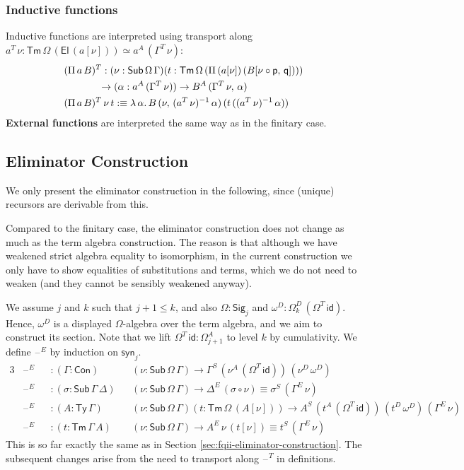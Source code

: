 \documentclass[12pt,a4paper,twoside,openany]{book}
\theoremstyle{remark}
\theoremstyle{definition}
\theoremstyle{theorem}
\newcommand{\id}{\mathsf{id}}
\newcommand{\Con}{\mathsf{Con}}
\newcommand{\Sub}{\mathsf{Sub}}
\newcommand{\Tm}{\mathsf{Tm}}
\newcommand{\Ty}{\mathsf{Ty}}
\newcommand{\El}{\mathsf{El}}
\newcommand{\blank}{\mathord{\hspace{1pt}\text{--}\hspace{1pt}}}
\newcommand{\Pii}{\Pi}
\newcommand{\Sig}{\mathsf{Sig}}
\newcommand{\p}{\mathsf{p}}
\newcommand{\q}{\mathsf{q}}
\newcommand{\syn}{\mathsf{syn}}
\newcommand{\defn}{:\equiv}
\begin{document}
\subsubsection{Inductive functions}
Inductive functions are interpreted using transport along $a^T\,\nu :
\Tm\,\Omega\,(\El\,(a[\nu])) \simeq a^A\,(\Gamma^T\,\nu)$:
\begin{alignat*}{3}
  &(\Pii\,a\,B)^T : (\nu : \Sub\,\Omega\,\Gamma)(t : \Tm\,\Omega\,(\Pii\,(a[\nu])\,(B[\nu\circ\p,\,\q])))\\
  & \hspace{3.5em}\to (\alpha : a^A\,(\Gamma^T\,\nu)) \to B^A\,(\Gamma^T\,\nu,\,\alpha)\\
  &(\Pii\,a\,B)^T\,\nu\,t \defn \lambda\,\alpha.\,
         B\,(\nu,\,(a^T\,\nu)^{-1}\,\alpha)\,(t\,((a^T\,\nu)^{-1}\,\alpha))
\end{alignat*}
\textbf{External functions} are interpreted the same way as in the finitary case.

\subsection{Eliminator Construction}

We only present the eliminator construction in the following, since (unique)
recursors are derivable from this.

Compared to the finitary case, the eliminator construction does not change as
much as the term algebra construction. The reason is that although we have
weakened strict algebra equality to isomorphism, in the current construction we
only have to show equalities of substitutions and terms, which we do not need to
weaken (and they cannot be sensibly weakened anyway).

We assume $j$ and $k$ such that $ j + 1 \leq k$, and also $\Omega : \Sig_j$ and
$\omega^D : \Omega^D_k\,(\Omega^T\,\id)$. Hence, $\omega^D$ is a displayed
$\Omega$-algebra over the term algebra, and we aim to construct its section.
Note that we lift $\Omega^T\,\id : \Omega^A_{j+1}$ to level $k$ by cumulativity.
We define $\blank^E$ by induction on $\syn_j$.
\begin{alignat*}{3}
  &\blank^E &&: (\Gamma : \Con)&&(\nu : \Sub\,\Omega\,\Gamma) \to \Gamma^S\,(\nu^A\,(\Omega^T\,\id))\,(\nu^D\,\omega^D)\\
  &\blank^E &&: (\sigma : \Sub\,\Gamma\,\Delta)&&(\nu : \Sub\,\Omega\,\Gamma) \to \Delta^E\,(\sigma \circ \nu) \equiv \sigma^S\,(\Gamma^E\,\nu)\\
  &\blank^E &&: (A : \Ty\,\Gamma)&&(\nu : \Sub\,\Omega\,\Gamma)(t : \Tm\,\Omega\,(A[\nu]))
     \to A^S\,(t^A\,(\Omega^T\,\id))\,(t^D\,\omega^D)\,(\Gamma^E\,\nu)\\
  &\blank^E &&: (t : \Tm\,\Gamma\,A)&&(\nu : \Sub\,\Omega\,\Gamma) \to A^E\,\nu\,(t[\nu]) \equiv t^S\,(\Gamma^E\,\nu)
\end{alignat*}
This is so far exactly the same as in Section
\ref{sec:fqii-eliminator-construction}. The subsequent changes arise from
the need to transport along $\blank^T$ in definitions.
\end{document}
